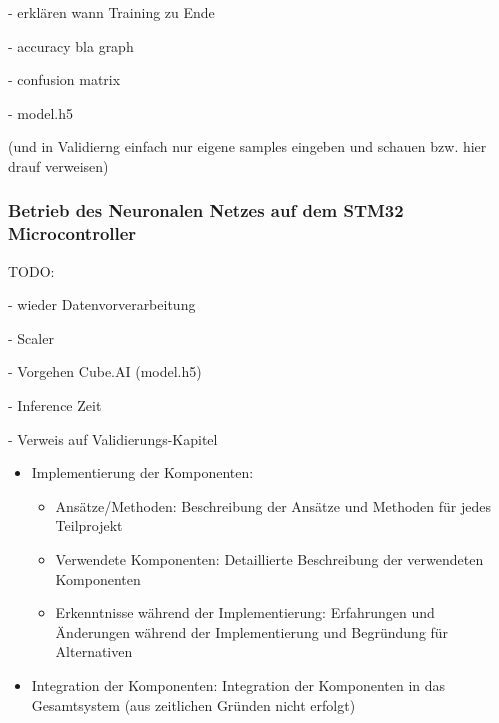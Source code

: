 - erklären wann Training zu Ende

- accuracy bla graph

- confusion matrix

- model.h5

(und in Validierng einfach nur eigene samples eingeben und schauen bzw. hier drauf verweisen)




\subsubsection{Betrieb des Neuronalen Netzes auf dem STM32 Microcontroller}
TODO:

- wieder Datenvorverarbeitung

- Scaler

- Vorgehen Cube.AI (model.h5)

- Inference Zeit

- Verweis auf Validierungs-Kapitel



\begin{itemize}
    \item Implementierung der Komponenten:
    \begin{itemize}
        \item Ansätze/Methoden: Beschreibung der Ansätze und Methoden für jedes Teilprojekt
        \item Verwendete Komponenten: Detaillierte Beschreibung der verwendeten Komponenten
        \item Erkenntnisse während der Implementierung: Erfahrungen und Änderungen während der Implementierung und Begründung für Alternativen
    \end{itemize}
    \item Integration der Komponenten: Integration der Komponenten in das Gesamtsystem (aus zeitlichen Gründen nicht erfolgt)
\end{itemize}



